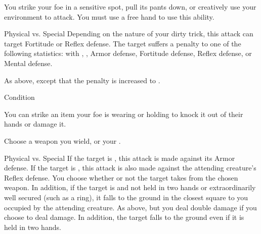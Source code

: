             \label{Dirty Trick} You strike your foe in a sensitive spot, pull its pants down, or creatively use your environment to attack.
            You must use a free hand to use this ability.
            \begin{ability}
                \begin{spelltargetinginfo}
                \end{spelltargetinginfo}
                \begin{spelleffects}
                    \begin{spellattack}{Physical vs. Special}
                        \spellspecial Depending on the nature of your dirty trick, this attack can target Fortitude or Reflex defense.
                        \spellsuccess The target suffers a  penalty to one of the following statistics:
                         with , , Armor defense, Fortitude defense, Reflex defense, or Mental defense.

                        \spellcritical As above, except that the penalty is increased to .
                    \end{spellattack}
                    \spelldur Condition
                \end{spelleffects}
            \end{ability}

            \label{Disarm} You can strike an item your foe is wearing or holding to knock it out of their hands or damage it.
            \begin{ability}
                \begin{spelltargetinginfo}
                    \spellspecial Choose a weapon you wield, or your .
                \end{spelltargetinginfo}
                \begin{spelleffects}
                    \begin{spellattack}{Physical vs. Special}
                        \spellspecial If the target is , this attack is made against its Armor defense.
                        If the target is , this attack is also made against the attending creature's Reflex defense.
                        \spellsuccess You choose whether or not the target takes  from the chosen weapon.
                        In addition, if the target is  and not held in two hands or extraordinarily well secured (such as a ring), it falls to the ground in the closest square to you occupied by the attending creature.
                        \spellcritical As above, but you deal double damage if you choose to deal damage.
                        In addition, the target falls to the ground even if it is held in two hands.
                    \end{spellattack}
                \end{spelleffects}
            \end{ability}


